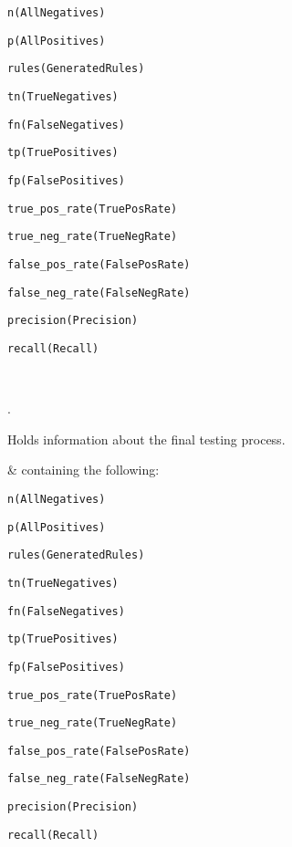 \begin{description}
\begin{arguments}
\begin{shortlist}
    \item \verb$n(AllNegatives)$
    \item \verb$p(AllPositives)$
    \item \verb$rules(GeneratedRules)$
    \item \verb$tn(TrueNegatives)$
    \item \verb$fn(FalseNegatives)$
    \item \verb$tp(TruePositives)$
    \item \verb$fp(FalsePositives)$
    \item \verb$true_pos_rate(TruePosRate)$
    \item \verb$true_neg_rate(TrueNegRate)$
    \item \verb$false_pos_rate(FalsePosRate)$
    \item \verb$false_neg_rate(FalseNegRate)$
    \item \verb$precision(Precision)$
    \item \verb$recall(Recall)$
\end{shortlist}

 \\
\end{arguments}

\begin{tags}
.
\end{tags}

Holds information about the final testing process.

\begin{arguments}
 &  containing the following:

\begin{shortlist}
    \item \verb$n(AllNegatives)$
    \item \verb$p(AllPositives)$
    \item \verb$rules(GeneratedRules)$
    \item \verb$tn(TrueNegatives)$
    \item \verb$fn(FalseNegatives)$
    \item \verb$tp(TruePositives)$
    \item \verb$fp(FalsePositives)$
    \item \verb$true_pos_rate(TruePosRate)$
    \item \verb$true_neg_rate(TrueNegRate)$
    \item \verb$false_pos_rate(FalsePosRate)$
    \item \verb$false_neg_rate(FalseNegRate)$
    \item \verb$precision(Precision)$
    \item \verb$recall(Recall)$
\end{shortlist}


\end{arguments}
\end{description}
